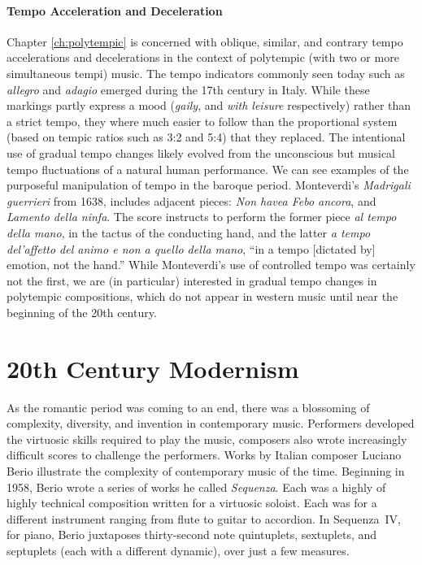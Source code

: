 \paragraph{Tempo Acceleration and Deceleration}
Chapter \ref{ch:polytempic}   is concerned with oblique, similar, and contrary
tempo accelerations and decelerations in the context of polytempic
(with two or more simultaneous tempi) music.  The tempo indicators
commonly seen today such as \textit{allegro} and \textit{adagio} emerged
during the 17th century in Italy. While these markings partly express
a mood (\textit{gaily}, and \textit{with leisure} respectively) rather
than a strict tempo, they where much easier to follow than the
proportional system (based on tempic ratios such as 3:2 and 5:4) that
they replaced.\cite{Sachs1953} The intentional use of gradual tempo
changes likely evolved from the unconscious but musical tempo
fluctuations of a natural human performance. We can see examples of
the purposeful manipulation of tempo in the baroque
period. Monteverdi's \textit{Madrigali guerrieri} from 1638, includes
adjacent pieces: \textit{Non havea Febo ancora}, and \textit{Lamento
  della ninfa}. The score instructs to perform the former piece
\textit{al tempo della mano}, in the tactus of the conducting hand,
and the latter \textit{a tempo del'affetto del animo e non a quello
  della mano}, ``in a tempo [dictated by] emotion, not the hand.''
While Monteverdi's use of controlled tempo was certainly not the
first, we are (in particular) interested in gradual tempo changes in
polytempic compositions, which do not appear in western music until
near the beginning of the 20th century.


\section{20th Century Modernism}
\label{sec:modernism}
As the romantic period was coming to an end, there was a blossoming of
complexity, diversity, and invention in contemporary music. Performers
developed the virtuosic skills required to play the music, composers
also wrote increasingly difficult scores to challenge the
performers.\cite{Grout2006} Works by Italian composer Luciano Berio
illustrate the complexity of contemporary music of the time. Beginning
in 1958, Berio wrote a series of works he called
\textit{Sequenza}. Each was a highly of highly technical composition
written for a virtuosic soloist. Each was for a different instrument
ranging from flute to guitar to accordion.  In Sequenza~IV, for piano,
Berio juxtaposes thirty-second note quintuplets, sextuplets, and
septuplets (each with a different dynamic), over just a few
measures. 

